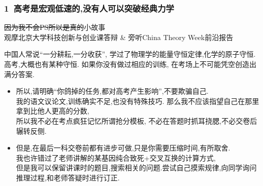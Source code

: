 \documentclass[10pt]{beamer}
\begin{document}
\begin{frame}
	\frametitle{1\ 高考是宏观低速的,没有人可以突破经典力学}

	\begin{example}
		\sout{因为我不会PS所以是真的}小故事\\
		观摩北京大学科技创新与创业课答辩 \& 旁听China Theory Week前沿报告
	\end{example}

	\pause{}

	中国人常说``一分耕耘,一分收获'', 学过了物理学的能量守恒定律,化学的原子守恒.\\
	高考,大概也有某种守恒. 如果你没有做过相应的训练, 在考场上不可能凭空创造出满分答案.\\

	\pause{}
	\vspace{2em}

	\begin{itemize}
		\item 所以,请明确``你鸽掉的任务,都对高考产生影响'',不要欺骗自己.\\
		我的语文议论文,训练确实不足,也没有特殊技巧. 那么我不应该指望自己在那里拿到比他人更高的分数,\\
		所以我不必在考点疯狂记忆所谓抢分模板, 不必在答题时抓耳挠腮,不必交卷后辗转反侧.\\

		\item 但是,在最后一科交卷前都有进步可做,只是你需要压缩时间,有所取舍.\\
		我也许错过了老师讲解的某基因纯合致死+交叉互换的计算方式,\\
		但是我可以保留讲课时的题目,搜索相关的问题.尝试自己摸索规律,向同学询问推理过程,和老师答疑时进行订正.\\
	\end{itemize}
\end{frame}
\end{document}
